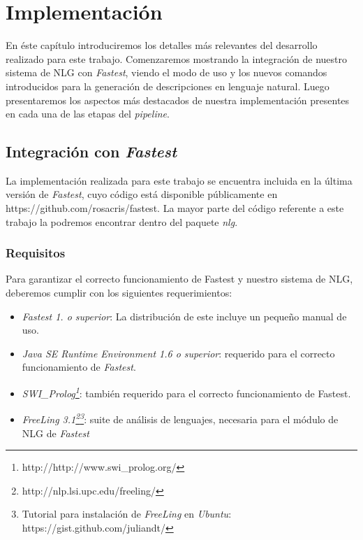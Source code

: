 \chapter{Implementación}
\label{cap:implementacion}

En éste capítulo introduciremos los detalles más relevantes del desarrollo realizado para este trabajo. Comenzaremos mostrando la integración de nuestro sistema de NLG con \textit{Fastest}, viendo el modo de uso y los nuevos comandos introducidos para la generación de descripciones en lenguaje natural. Luego presentaremos los aspectos más destacados de nuestra implementación presentes en cada una de las etapas del \emph{pipeline}.

\section{Integración con \emph{Fastest}}

La implementación realizada para este trabajo se encuentra incluida en la última versión de \emph{Fastest}, cuyo código está disponible públicamente en https://github.com/rosacris/fastest. La mayor parte del código referente a este trabajo la podremos encontrar dentro del paquete \textit{nlg}.

\subsection*{Requisitos}

Para garantizar el correcto funcionamiento de Fastest y nuestro sistema de NLG, deberemos cumplir con los siguientes requerimientos:

\begin{itemize}
 \item  \emph{Fastest 1. o superior}: La distribución de este incluye un pequeño manual de uso.
 \item  \emph{Java SE Runtime Environment 1.6 o superior}: requerido para el correcto funcionamiento de \emph{Fastest}.
 \item  \emph{SWI\_Prolog\footnote{http://http://www.swi\_prolog.org/}}: también requerido para el correcto funcionamiento de Fastest.
 \item  \emph{FreeLing 3.1\footnote{http://nlp.lsi.upc.edu/freeling/}\footnote{Tutorial para instalación de \emph{FreeLing} en \emph{Ubuntu}: https://gist.github.com/juliandt/}}: suite de análisis de lenguajes, necesaria para el módulo de NLG de \emph{Fastest}
\end{itemize}

